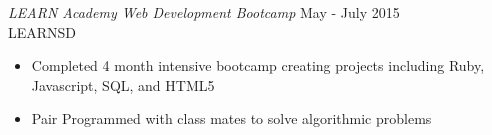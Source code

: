 \documentclass[margin]{res}
\begin{document}
\begin{resume}
  {\sl LEARN Academy Web Development Bootcamp} \hfill May - July 2015 \\
  LEARNSD
  \begin{itemize}
      \item Completed 4 month intensive bootcamp creating projects including Ruby, Javascript, SQL, and HTML5
      \item Pair Programmed with class mates to solve algorithmic problems
  \end{itemize}






\end{resume}
\end{document}
